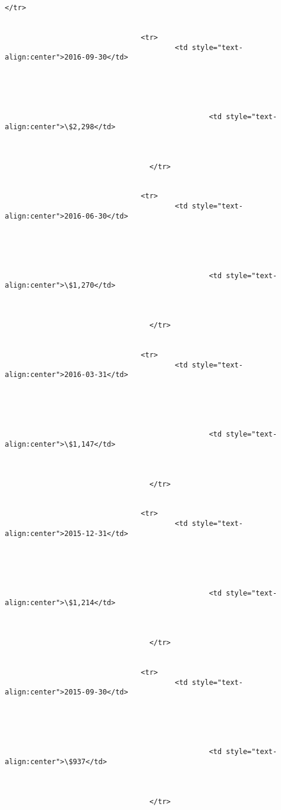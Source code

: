 \documentclass[11pt]{article}
\begin{document}
\begin{Verbatim}[commandchars=\\\{\}]
                                  </tr>


                                <tr>
                                        <td style="text-
align:center">2016-09-30</td>





                                                <td style="text-
align:center">\$2,298</td>



                                  </tr>


                                <tr>
                                        <td style="text-
align:center">2016-06-30</td>





                                                <td style="text-
align:center">\$1,270</td>



                                  </tr>


                                <tr>
                                        <td style="text-
align:center">2016-03-31</td>





                                                <td style="text-
align:center">\$1,147</td>



                                  </tr>


                                <tr>
                                        <td style="text-
align:center">2015-12-31</td>





                                                <td style="text-
align:center">\$1,214</td>



                                  </tr>


                                <tr>
                                        <td style="text-
align:center">2015-09-30</td>





                                                <td style="text-
align:center">\$937</td>



                                  </tr>



\end{Verbatim}
\end{document}
